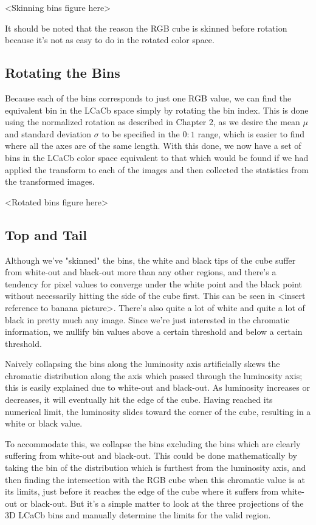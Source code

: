 <Skinning bins figure here>

It should be noted that the reason the RGB cube is skinned before rotation because it's not as easy to do in the rotated color space.


\subsection{Rotating the Bins}\label{sec:RotatingTheBins}
Because each of the bins corresponds to just one RGB value, we can find the equivalent bin in the LCaCb space simply by rotating the bin index. This is done using the normalized rotation as described in Chapter 2, as we desire the mean $\mu$ and standard deviation $\sigma$ to be specified in the $0:1$ range, which is easier to find where all the axes are of the same length. With this done, we now have a set of bins in the LCaCb color space equivalent to that which would be found if we had applied the transform to each of the images and then collected the statistics from the transformed images.

<Rotated bins figure here>


\subsection{Top and Tail}\label{sec:TopAndTail}
Although we've "skinned" the bins, the white and black tips of the cube suffer from white-out and black-out more than any other regions, and there's a tendency for pixel values to converge under the white point and the black point without necessarily hitting the side of the cube first. This can be seen in <insert reference to banana picture>. There's also quite a lot of white and quite a lot of black in pretty much any image. Since we're just interested in the chromatic information, we nullify bin values above a certain threshold and below a certain threshold.

Naively collapsing the bins along the luminosity axis artificially skews the chromatic distribution along the axis which passed through the luminosity axis; this is easily explained due to white-out and black-out. As luminosity increases or decreases, it will eventually hit the edge of the cube. Having reached its numerical limit, the luminosity slides toward the corner of the cube, resulting in a white or black value.

To accommodate this, we collapse the bins excluding the bins which are clearly suffering from white-out and black-out. This could be done mathematically by taking the bin of the distribution which is furthest from the luminosity axis, and then finding the intersection with the RGB cube when this chromatic value is at its limits, just before it reaches the edge of the cube where it suffers from white-out or black-out. But it's a simple matter to look at the three projections of the 3D LCaCb bins and manually determine the limits for the valid region.


